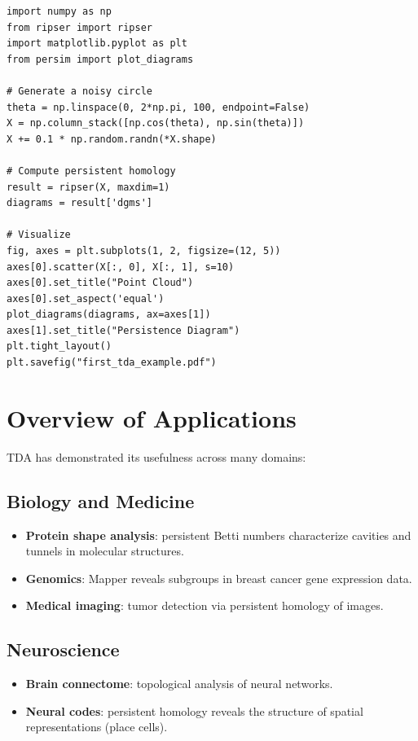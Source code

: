 \begin{codeblock}[title=\textbf{First Example with Ripser}]
\begin{verbatim}
import numpy as np
from ripser import ripser
import matplotlib.pyplot as plt
from persim import plot_diagrams

# Generate a noisy circle
theta = np.linspace(0, 2*np.pi, 100, endpoint=False)
X = np.column_stack([np.cos(theta), np.sin(theta)])
X += 0.1 * np.random.randn(*X.shape)

# Compute persistent homology
result = ripser(X, maxdim=1)
diagrams = result['dgms']

# Visualize
fig, axes = plt.subplots(1, 2, figsize=(12, 5))
axes[0].scatter(X[:, 0], X[:, 1], s=10)
axes[0].set_title("Point Cloud")
axes[0].set_aspect('equal')
plot_diagrams(diagrams, ax=axes[1])
axes[1].set_title("Persistence Diagram")
plt.tight_layout()
plt.savefig("first_tda_example.pdf")
\end{verbatim}
\end{codeblock}

\section{Overview of Applications}

TDA has demonstrated its usefulness across many domains:

\subsection{Biology and Medicine}
\begin{itemize}
  \item \textbf{Protein shape analysis}: persistent Betti numbers
        characterize cavities and tunnels in molecular structures.
  \item \textbf{Genomics}: Mapper reveals subgroups in breast cancer
        gene expression data.
  \item \textbf{Medical imaging}: tumor detection via persistent
        homology of images.
\end{itemize}

\subsection{Neuroscience}
\begin{itemize}
  \item \textbf{Brain connectome}: topological analysis of neural
        networks.
  \item \textbf{Neural codes}: persistent homology reveals the
        structure of spatial representations (place cells).
\end{itemize}

